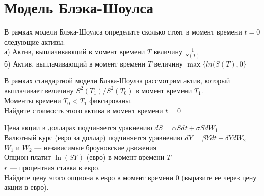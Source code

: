 \section{Модель Блэка-Шоулса} 

\begin{problem}
В рамках модели Блэка-Шоулса определите сколько стоят в момент времени $t=0$ следующие активы: \\
а) Актив, выплачивающий в момент времени $T$ величину $\frac{1}{S(T)}$ \\
б) Актив, выплачивающий в момент времени $T$ величину $\max\{ln(S(T),0\}$ 
\end{problem} 
\begin{solution} 

\end{solution}

\begin{problem}
В рамках стандартной модели Блэка-Шоулза рассмотрим актив, который выплачивает величину $S^{2}(T_{1})/S^{2}(T_{0})$ в момент времени $T_{1}$. \\
Моменты времени $T_{0}<T_{1}$ фиксированы. \\
Найдите стоимость этого актива в момент времени $t=0$ 
\end{problem} 
\begin{solution} 

\end{solution}

\begin{problem}
Цена акции в долларах подчиняется уравнению $dS=\alpha Sdt+\sigma SdW_{1}$ \\
Валютный курс (евро за доллар) подчиняется уравнению $dY=\beta Ydt+\delta YdW_{2}$ \\
$W_{1}$ и $W_{2}$ --- независимые броуновские движения \\
Опцион платит $\ln(SY)$ (евро) в момент времени $T$ \\
$r$ --- процентная ставка в евро. \\
Найдите цену этого опциона в евро в момент времени $0$ (выразите ее через цену акции в евро). 
\end{problem} 
\begin{solution} 

\end{solution}

